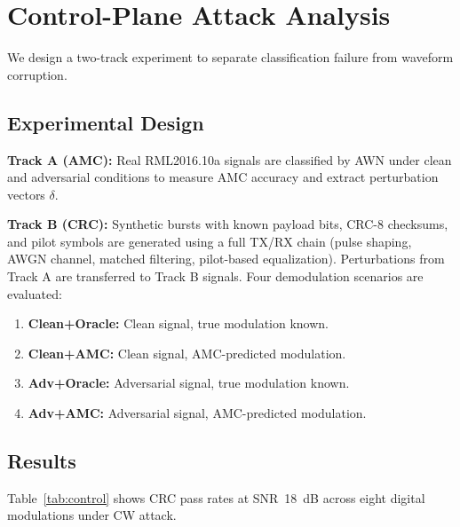 \documentclass[letterpaper,twocolumn,10pt]{article}
\begin{document}
\section{Control-Plane Attack Analysis}
\label{sec:control}

We design a two-track experiment to separate classification failure
from waveform corruption.

\subsection{Experimental Design}

\textbf{Track A (AMC):} Real RML2016.10a signals are classified by
AWN under clean and adversarial conditions to measure AMC accuracy
and extract perturbation vectors $\delta$.

\textbf{Track B (CRC):} Synthetic bursts with known payload bits,
CRC-8 checksums, and pilot symbols are generated using a full TX/RX
chain (pulse shaping, AWGN channel, matched filtering, pilot-based
equalization). Perturbations from Track A are transferred to Track B
signals. Four demodulation scenarios are evaluated:

\begin{enumerate}
\item \textbf{Clean+Oracle:} Clean signal, true modulation known.
\item \textbf{Clean+AMC:} Clean signal, AMC-predicted modulation.
\item \textbf{Adv+Oracle:} Adversarial signal, true modulation known.
\item \textbf{Adv+AMC:} Adversarial signal, AMC-predicted modulation.
\end{enumerate}

\subsection{Results}

Table~\ref{tab:control} shows CRC pass rates at SNR~18~dB across
eight digital modulations under CW attack.
\end{document}
